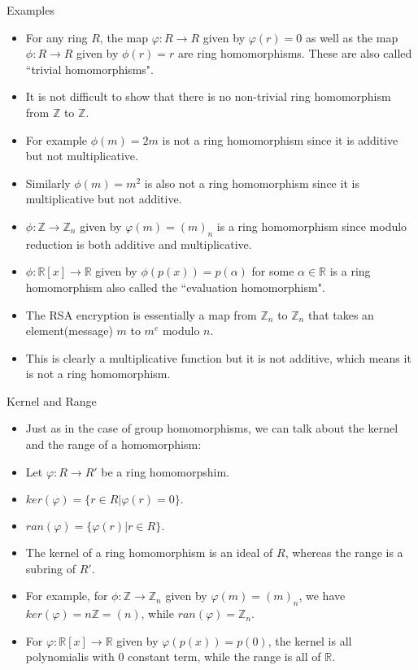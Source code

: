 \documentclass[ %
 10pt, xcolor={dvipsnames,svgnames,x11names,hyperref},
   hyperref={colorlinks=true,citecolor=green,linkcolor=DarkRed,urlcolor=ProcessBlue,anchorcolor=blue}
  ]{beamer}
\newenvironment{stepitemize}{\begin{itemize}[<+->]}{\end{itemize} }
\newcommand{\Z}{\mathbb{Z}}
\newcommand{\R}{\mathbb{R}}
\begin{document}
\begin{frame}{Examples}
\begin{stepitemize}
\item For any ring $R$, the map $\varphi:R \rightarrow R$ given by $\varphi(r)=0$ as well as the map $\phi:R \rightarrow R$ given by $\phi(r)=r$ are ring homomorphisms. These are also called ``trivial homomorphisms".
    \item It is not difficult to show that there is no non-trivial ring homomorphism from $\Z$ to $\Z$. 
    \item For example $\phi(m)=2m$ is not a ring homomorphism since it is additive but not multiplicative. 
    \item Similarly $\phi(m)=m^2$ is also not a ring homomorphism since it is multiplicative but not additive. 
    \item $\phi:\Z \rightarrow \Z_n$ given by $\varphi(m)=(m)_n$ is a ring homomorphism since modulo reduction is both additive and multiplicative. 
    \item $\phi:\R[x]\rightarrow \R$ given by $\phi(p(x)) = p(\alpha)$ for some $\alpha \in \R$ is a ring homomorphism also called the ``evaluation homomorphism".
   \item The RSA encryption is essentially a map from $\Z_n$ to $\Z_n$ that takes an element(message) $m$ to $m^e$ modulo $n$. 
   \item This is clearly a multiplicative function but it is not additive, which means it is not a ring homomorphism.
\end{stepitemize}
\end{frame}

\begin{frame}{Kernel and Range}
\begin{stepitemize}
\item Just as in the case of group homomorphisms, we can talk about the kernel and the range of a homomorphism:
\item Let $\varphi:R\rightarrow R'$ be a ring homomorpshim. \item $ker(\varphi) = \{r\in R|\varphi(r)=0\}.$
\item $ran(\varphi) = \{\varphi(r)|r\in R\}.$
\item The kernel of a ring homomorphism is an ideal of $R$, whereas the range is a subring of $R'$.
\item For example, for $\phi:\Z \rightarrow \Z_n$ given by $\varphi(m)=(m)_n$, we have $ker(\varphi) = n\Z = (n)$, while $ran(\varphi) = \Z_n$.
\item For $\varphi:\R[x]\rightarrow \R$ given by $\varphi(p(x))=p(0)$, the kernel is all polynomialis with $0$ constant term, while the range is all of $\R$.
\end{stepitemize}
\end{frame}
\end{document}
